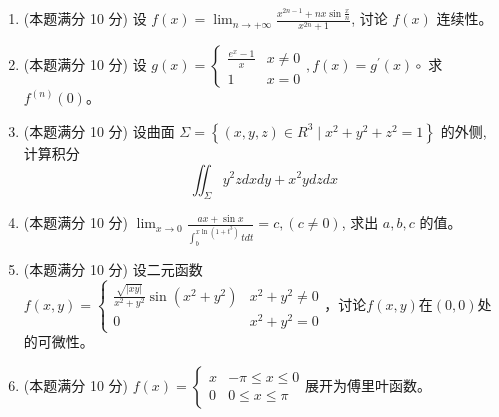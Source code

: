 \begin{enumerate}



\item 
(本题满分 10 分)
设 $f(x)=\lim _{n \rightarrow+\infty} \frac{x^{2 n-1}+n x \sin \frac{x}{n}}{x^{2 n}+1}$, 讨论 $f(x)$ 连续性。



\item 
(本题满分 10 分)
设 $g(x)=\left\{\begin{array}{cc}\frac{e^{x}-1}{x} & x \neq 0 \\ 1 & x=0\end{array},  f(x)=g^{\prime}(x) \circ\right.$ 求 $f^{(n)}(0)$。



\newpage
\item 
(本题满分 10 分)
设曲面 $\Sigma=\left\{(x, y, z) \in R^{3} \mid x^{2}+y^{2}+z^{2}=1\right\}$ 的外侧, 计算积分
\[ 
\iint_{\Sigma} y^{2} z d x d y+x^{2} y d z d x
 \]




\item 
(本题满分 10 分)
$\lim _{x \rightarrow 0} \frac{a x+\sin x}{\int_{b}^{x \ln \left(1+t^{3}\right)}{t} d t}=c,(c \neq 0)$, 求出 $a, b, c$ 的值。




\item 
(本题满分 10 分)
设二元函数 $f(x, y)=\left\{\begin{array}{ll}\frac{\sqrt{|x y|}}{x^{2}+y^{2}} \sin \left(x^{2}+y^{2}\right) & x^{2}+y^{2} \neq 0 \\ 0 & x^{2}+y^{2}=0\end{array}\right.$，讨论$ f(x,y) $在$ (0,0) $处的可微性。	





\item 
(本题满分 10 分)
$f(x)=\left\{\begin{array}{cc}x & -\pi \leq x \leq 0 \\ 0 & 0 \leq x \leq \pi\end{array}\right.$展开为傅里叶函数。





\end{enumerate}
